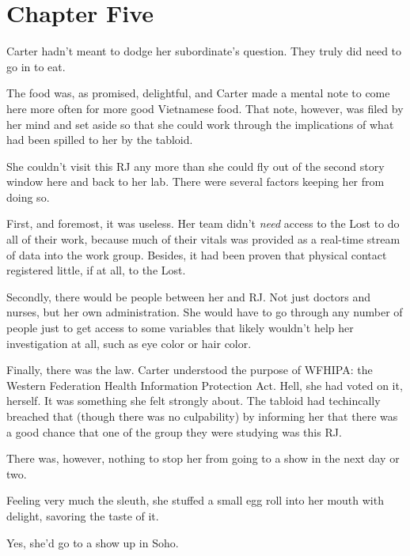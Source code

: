 \chapter*{Chapter Five}

Carter hadn't meant to dodge her subordinate's question.  They truly did need to go in to eat.

The food was, as promised, delightful, and Carter made a mental note to come here more often for more good Vietnamese food.  That note, however, was filed by her mind and set aside so that she could work through the implications of what had been spilled to her by the tabloid.

She couldn't visit this RJ any more than she could fly out of the second story window here and back to her lab.  There were several factors keeping her from doing so.

First, and foremost, it was useless.  Her team didn't \textit{need} access to the Lost to do all of their work, because much of their vitals was provided as a real-time stream of data into the work group.  Besides, it had been proven that physical contact registered little, if at all, to the Lost.

Secondly, there would be people between her and RJ.  Not just doctors and nurses, but her own administration.  She would have to go through any number of people just to get access to some variables that likely wouldn't help her investigation at all, such as eye color or hair color.

Finally, there was the law.  Carter understood the purpose of WFHIPA: the Western Federation Health Information Protection Act.  Hell, she had voted on it, herself.  It was something she felt strongly about.  The tabloid had techincally breached that (though there was no culpability) by informing her that there was a good chance that one of the group they were studying was this RJ.

There was, however, nothing to stop her from going to a show in the next day or two.

Feeling very much the sleuth, she stuffed a small egg roll into her mouth with delight, savoring the taste of it.

Yes, she'd go to a show up in Soho.

\secdiv
